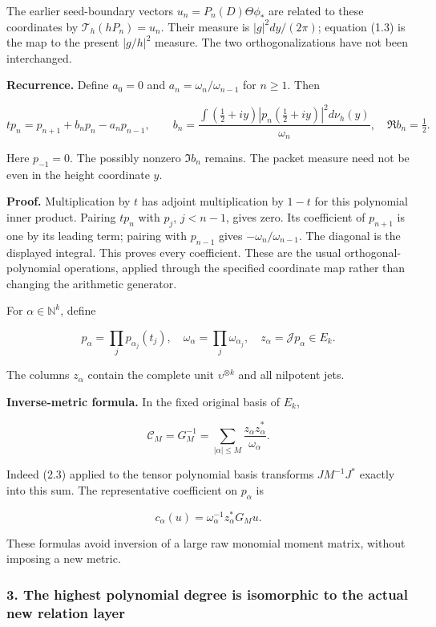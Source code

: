 The earlier seed-boundary vectors \(u_n=P_n(D)\Theta\phi_*\) are related
to these coordinates by \(\mathcal T_h(hP_n)=u_n\). Their measure is
\(|g|^2dy/(2\pi)\); equation (1.3) is the map to the present \(|g/h|^2\)
measure. The two orthogonalizations have not been interchanged.

\textbf{Recurrence.} Define \(a_0=0\) and \(a_n=\omega_n/\omega_{n-1}\)
for \(n\ge1\). Then

\[\boxed{tp_n=p_{n+1}+b_np_n-a_np_{n-1},\qquad
b_n=\frac{\int(\tfrac12+iy)|p_n(\tfrac12+iy)|^2d\nu_h(y)}{\omega_n},\quad \Re b_n=\tfrac12.}\tag{2.4}\]

Here \(p_{-1}=0\). The possibly nonzero \(\Im b_n\) remains. The packet
measure need not be even in the height coordinate \(y\).

\textbf{Proof.} Multiplication by \(t\) has adjoint multiplication by
\(1-t\) for this polynomial inner product. Pairing \(tp_n\) with
\(p_j\), \(j<n-1\), gives zero. Its coefficient of \(p_{n+1}\) is one by
its leading term; pairing with \(p_{n-1}\) gives
\(-\omega_n/\omega_{n-1}\). The diagonal is the displayed integral. This
proves every coefficient. These are the usual orthogonal-polynomial
operations, applied through the specified coordinate map rather than
changing the arithmetic generator.

For \(\alpha\in\mathbb N^k\), define

\[p_\alpha=\prod_jp_{\alpha_j}(t_j),\quad
\omega_\alpha=\prod_j\omega_{\alpha_j},\quad
z_\alpha=\mathcal Jp_\alpha\in E_k.\tag{2.5}\]

The columns \(z_\alpha\) contain the complete unit
\(\upsilon^{\otimes k}\) and all nilpotent jets.

\textbf{Inverse-metric formula.} In the fixed original basis of \(E_k\),

\[\boxed{\mathcal C_M=G_M^{-1}=\sum_{|\alpha|\le M}\frac{z_\alpha z_\alpha^*}{\omega_\alpha}.}\tag{2.6}\]

Indeed (2.3) applied to the tensor polynomial basis transforms
\(J M^{-1}J^*\) exactly into this sum. The representative coefficient on
\(p_\alpha\) is

\[\boxed{c_\alpha(u)=\omega_\alpha^{-1}z_\alpha^*G_Mu.}\tag{2.7}\]

These formulas avoid inversion of a large raw monomial moment matrix,
without imposing a new metric.

\subsubsection{3. The highest polynomial degree is isomorphic to the actual
new relation
layer}\label{symmetric_frontier:the-highest-polynomial-degree-is-isomorphic-to-the-actual-new-relation-layer}

